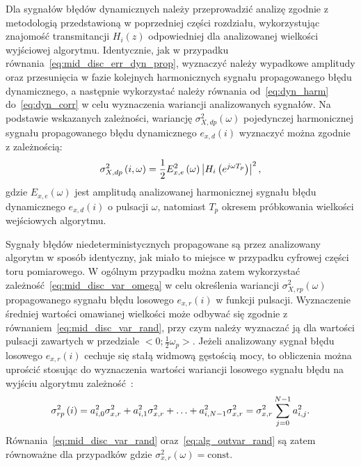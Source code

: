 Dla sygnałów błędów dynamicznych należy przeprowadzić analizę zgodnie z metodologią przedstawioną w poprzedniej części rozdziału, wykorzystując znajomość transmitancji $H_{i}(z)$ odpowiedniej dla analizowanej wielkości wyjściowej algorytmu. Identycznie, jak w przypadku równania~\eqref{eq:mid_disc_err_dyn_prop}, wyznaczyć należy wypadkowe amplitudy oraz przesunięcia w fazie kolejnych harmonicznych sygnału propagowanego błędu dynamicznego, a następnie wykorzystać należy równania od~\eqref{eq:dyn_harm} do~\eqref{eq:dyn_corr} w celu wyznaczenia wariancji analizowanych sygnałów. Na podstawie wskazanych zależności, wariancję $\sigma_{X,dp}^{2}(\omega)$ pojedynczej harmonicznej sygnału propagowanego błędu dynamicznego $e_{x,d}(i)$ wyznaczyć można zgodnie z zależnością:
\begin{equation}
\sigma_{X,dp}^{2} \left(i, \omega\right) = \frac{1}{2} E_{x,e}^{2} \left(\omega\right) \left| H_{i} \left(e^{j\omega T_{p}}\right) \right|^{2} \label{eq:alg_outvar_dyn},
\end{equation}
gdzie $E_{x,e}(\omega)$ jest amplitudą analizowanej harmonicznej sygnału błędu dynamicznego $e_{x,d}(i)$ o pulsacji $\omega$, natomiast $T_{p}$ okresem próbkowania wielkości wejściowych algorytmu.

Sygnały błędów niedeterministycznych propagowane są przez analizowany algorytm w sposób identyczny, jak miało to miejsce w przypadku cyfrowej części toru pomiarowego. W ogólnym przypadku można zatem wykorzystać zależność~\eqref{eq:mid_disc_var_omega} w celu określenia wariancji $\sigma_{X,rp}^{2}(\omega)$ propagowanego sygnału błędu losowego $e_{x,r}(i)$ w funkcji pulsacji. Wyznaczenie średniej wartości omawianej wielkości może odbywać się zgodnie z równaniem~\eqref{eq:mid_disc_var_rand}, przy czym należy wyznaczać ją dla wartości pulsacji zawartych w przedziale $<0; \frac{1}{2} \omega_{p}>$. Jeżeli analizowany sygnał błędu losowego $e_{x,r}(i)$ cechuje się stałą widmową gęstością mocy, to obliczenia można uprościć stosując do wyznaczenia wartości wariancji losowego sygnału błędu na wyjściu algorytmu zależność~\cite{jakubiec_system}:
\begin{equation}
\sigma_{rp}^{2} \left(i\right) = a_{i, 0}^{2} \sigma_{x,r}^{2} + a_{i, 1}^{2} \sigma_{x,r}^{2} + \hdots + a_{i, N-1}^{2} \sigma_{x,r}^{2} = \sigma_{x,r}^{2} \sum _{j=0} ^{N-1} {a_{i, j}^{2}} \label{eq:alg_outvar_rand}.
\end{equation}
Równania~\eqref{eq:mid_disc_var_rand} oraz~\eqref{eq:alg_outvar_rand} są zatem równoważne dla przypadków gdzie $\sigma_{x,r}^{2}(\omega) = \text{const}$.

